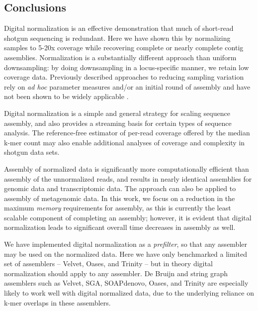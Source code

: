 \documentclass{pnastwo}
\begin{document}
\begin{article}
\subsection{Conclusions}

Digital normalization is an effective demonstration
that much of short-read shotgun sequencing is redundant.  Here we have
shown this by normalizing samples to 5-20x coverage while recovering
complete or nearly complete contig assemblies.  Normalization is a
substantially different approach than uniform downsampling: by doing
downsampling in a locus-specific manner, we retain low coverage data.
Previously described approaches to reducing sampling variation rely on
{\em ad hoc} parameter measures and/or an initial round of assembly
and have not been shown to be widely applicable
\cite{pubmed19724646,pubmed22028825}.

Digital normalization is a simple and general strategy for scaling
sequence assembly, and also provides a streaming basis for certain
types of sequence analysis.  The reference-free estimator of per-read
coverage offered by the median k-mer count may also enable additional
analyses of coverage and complexity in shotgun data sets.

Assembly of normalized data is significantly more computationally
efficient than assembly of the unnormalized reads, and results in nearly
identical assemblies for genomic data and transcriptomic data.  The
approach can also be applied to assembly of metagenomic data.  In this
work, we focus on a reduction in the maximum {\em memory} requirements
for assembly, as this is currently the least scalable component of
completing an assembly; however, it is evident that digital
normalization leads to significant overall time decreases in
assembly as well.

We have implemented digital normalization as a {\em prefilter}, so
that any assembler may be used on the normalized data.  Here we have
only benchmarked a limited set of assemblers -- Velvet, Oases, and
Trinity -- but in theory digital normalization should apply to any
assembler.  De Bruijn and string graph assemblers such as Velvet, SGA,
SOAPdenovo, Oases, and Trinity are especially likely to work well with
digital normalized data, due to the underlying reliance on k-mer
overlaps in these assemblers.



\end{article}
\end{document}
